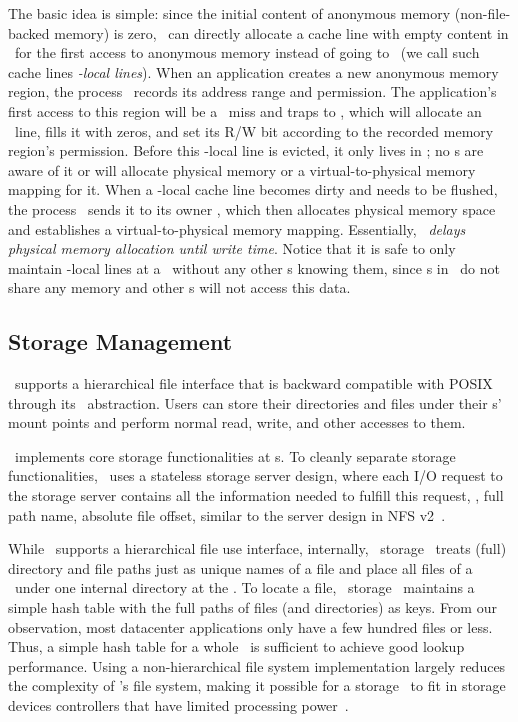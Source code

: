 \documentclass[10pt,times,twocolumn]{z2-article}
\begin{document}
{{{{{{{The basic idea is simple: since the initial content of anonymous memory 
(non-file-backed memory) is zero, %
\lego\ can directly allocate a cache line with empty content
in \excache\ for the first access to 
anonymous memory instead of going to \mcomponent\
(we call such cache lines {\em \pcomponent{}-local lines}).
When an application creates a new anonymous memory region, the process \microos\ records its address range and permission.
The application's first access to this region will be a \excache\ miss and traps to \lego,
which will allocate an \excache\ line, fills it with zeros, 
and set its R/W bit according to the recorded memory region's permission.
Before this \pcomponent{}-local line is evicted, it only lives in \excache;
no \mcomponent{}s are aware of it or will allocate physical memory or a virtual-to-physical memory mapping for it.
When a \pcomponent{}-local cache line becomes dirty and needs to be flushed, 
the process \microos\ sends it to its owner \mcomponent, which then
allocates physical memory space and establishes a virtual-to-physical memory mapping.
Essentially, \lego\ {\em delays physical memory allocation until write time}.
Notice that it is safe to only maintain \pcomponent{}-local lines at a \pcomponent{} \excache\ 
without any other \pcomponent{}s knowing them, 
since \pcomponent{}s in \lego\ do not share any memory
and other \pcomponent{}s will not access this data.

\subsection{Storage Management}
\lego\ supports a hierarchical file interface that is backward compatible with POSIX 
through its \vnode\ abstraction. 
Users can store their directories and files under their \vnode{}s' mount points
and perform normal read, write, and other accesses to them.

\lego\ implements core storage functionalities at \scomponent{}s.
To cleanly separate storage functionalities, \lego\ uses a stateless storage server design, 
where each I/O request to the storage server contains all the information needed to 
fulfill this request, \eg, full path name, absolute file offset,
similar to the server design in NFS v2~\cite{Sandberg-NFS-85}.

While \lego\ supports a hierarchical file use interface,
internally, \lego\ storage \microos\ treats (full) directory and file paths just as unique names of a file
and place all files of a \vnode\ under one internal directory at the \scomponent{}.
To locate a file, \lego\ storage \microos\ maintains a simple hash table with the full paths of files (and directories) as keys.
From our observation, most datacenter applications only have a few hundred files or less.
Thus, a simple hash table for a whole \vnode\ is sufficient to achieve good lookup performance.
Using a non-hierarchical file system implementation largely reduces the complexity of \lego's file system,
making it possible for a storage \microos\ to fit in storage devices controllers that have limited processing power~\cite{Willow}.

}}}}}}}
\end{document}
